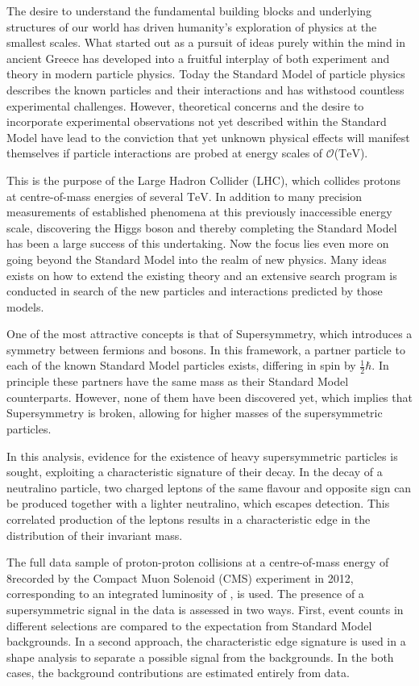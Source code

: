 The desire to understand the fundamental building blocks and underlying structures of our world has driven humanity's exploration of physics at the smallest scales. What started out as a pursuit of ideas purely within the mind in ancient Greece has developed into a fruitful interplay of both experiment and theory in modern particle physics. Today the Standard Model of particle physics describes the known particles and their interactions and has withstood countless experimental challenges. However, theoretical concerns and the desire to incorporate experimental observations not yet described within the Standard Model have lead to the conviction that yet unknown physical effects will manifest themselves if particle interactions are probed at energy scales of $\mathcal{O}$($\mathrm{TeV}$).

This is the purpose of the Large Hadron Collider (LHC), which collides protons at centre-of-mass energies of several $\mathrm{TeV}$. In addition to many precision measurements of established phenomena at this previously inaccessible energy scale, discovering the Higgs boson and thereby completing the Standard Model has been a large success of this undertaking. Now the focus lies even more on going beyond the Standard Model into the realm of new physics. Many ideas exists on how to extend the existing theory and an extensive search program is conducted in search of the new particles and interactions predicted by those models. 

One of the most attractive concepts is that of Supersymmetry, which introduces a symmetry between fermions and bosons. In this framework, a partner particle to each of the known Standard Model particles exists, differing in spin by $\frac{1}{2}\hbar$. In principle these partners have the same mass as their Standard Model counterparts. However, none of them have been discovered yet, which implies that Supersymmetry is broken, allowing for higher masses of the supersymmetric particles.

In this analysis, evidence for the existence of heavy supersymmetric particles is sought, exploiting a characteristic signature of their decay. In the decay of a neutralino particle, two charged leptons of the same flavour and opposite sign can be produced together with a lighter neutralino, which escapes detection. This correlated production of the leptons results in a characteristic edge in the distribution of their invariant mass.

The full data sample of proton-proton collisions at a centre-of-mass energy of 8\TeV recorded by the Compact Muon Solenoid (CMS) experiment in 2012, corresponding to an integrated luminosity of \lumi, is used. The presence of a supersymmetric signal in the data is assessed in two ways. First, event counts in different selections are compared to the expectation from Standard Model backgrounds. In a second approach, the characteristic edge signature is used in a shape analysis to separate a possible signal from the backgrounds. In the both cases, the background contributions are estimated entirely from data. 

